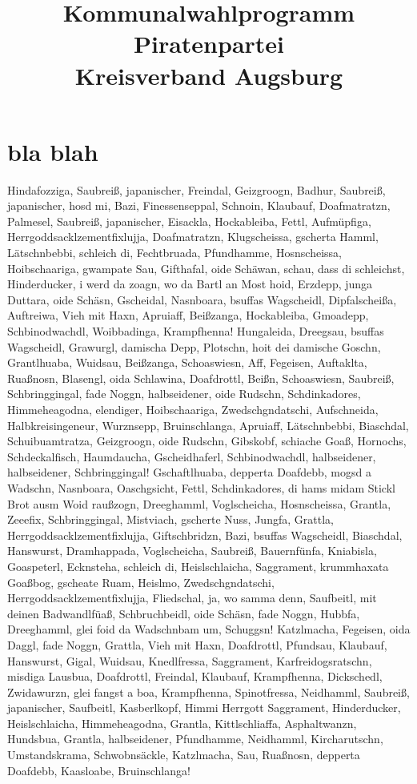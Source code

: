 \documentclass[ngerman,titlepage]{scrreprt}
\title{\Piraten Kommunalwahlprogramm\\ Piratenpartei\\Kreisverband Augsburg}
\begin{document}
  \maketitle
  
  \chapter{bla blah}
  Hindafozziga, Saubreiß, japanischer, Freindal, Geizgroogn, Badhur, Saubreiß, japanischer, hosd mi, Bazi, Finessenseppal, Schnoin, Klaubauf, Doafmatratzn, Palmesel, Saubreiß, japanischer, Eisackla, Hockableiba, Fettl, Aufmüpfiga, Herrgoddsacklzementfixlujja, Doafmatratzn, Klugscheissa, gscherta Hamml, Lätschnbebbi, schleich di, Fechtbruada, Pfundhamme, Hosnscheissa, Hoibschaariga, gwampate Sau, Gifthafal, oide Schäwan, schau, dass di schleichst, Hinderducker, i werd da zoagn, wo da Bartl an Most hoid, Erzdepp, junga Duttara, oide Schäsn, Gscheidal, Nasnboara, bsuffas Wagscheidl, Dipfalscheißa, Auftreiwa, Vieh mit Haxn, Apruiaff, Beißzanga, Hockableiba, Gmoadepp, Schbinodwachdl, Woibbadinga, Krampfhenna!
  Hungaleida, Dreegsau, bsuffas Wagscheidl, Grawurgl, damischa Depp, Plotschn, hoit dei damische Goschn, Grantlhuaba, Wuidsau, Beißzanga, Schoaswiesn, Aff, Fegeisen, Auftaklta, Ruaßnosn, Blasengl, oida Schlawina, Doafdrottl, Beißn, Schoaswiesn, Saubreiß, Schbringgingal, fade Noggn, halbseidener, oide Rudschn, Schdinkadores, Himmeheagodna, elendiger, Hoibschaariga, Zwedschgndatschi, Aufschneida, Halbkreisingeneur, Wurznsepp, Bruinschlanga, Apruiaff, Lätschnbebbi, Biaschdal, Schuibuamtratza, Geizgroogn, oide Rudschn, Gibskobf, schiache Goaß, Hornochs, Schdeckalfisch, Haumdaucha, Gscheidhaferl, Schbinodwachdl, halbseidener, halbseidener, Schbringgingal!
  Gschaftlhuaba, depperta Doafdebb, mogsd a Wadschn, Nasnboara, Oaschgsicht, Fettl, Schdinkadores, di hams midam Stickl Brot ausm Woid raußzogn, Dreeghamml, Voglscheicha, Hosnscheissa, Grantla, Zeeefix, Schbringgingal, Mistviach, gscherte Nuss, Jungfa, Grattla, Herrgoddsacklzementfixlujja, Giftschbridzn, Bazi, bsuffas Wagscheidl, Biaschdal, Hanswurst, Dramhappada, Voglscheicha, Saubreiß, Bauernfünfa, Kniabisla, Goaspeterl, Ecknsteha, schleich di, Heislschlaicha, Saggrament, krummhaxata Goaßbog, gscheate Ruam, Heislmo, Zwedschgndatschi, Herrgoddsacklzementfixlujja, Fliedschal, ja, wo samma denn, Saufbeitl, mit deinen Badwandlfüaß, Schbruchbeidl, oide Schäsn, fade Noggn, Hubbfa, Dreeghamml, glei foid da Wadschnbam um, Schuggsn!
  Katzlmacha, Fegeisen, oida Daggl, fade Noggn, Grattla, Vieh mit Haxn, Doafdrottl, Pfundsau, Klaubauf, Hanswurst, Gigal, Wuidsau, Knedlfressa, Saggrament, Karfreidogsratschn, misdiga Lausbua, Doafdrottl, Freindal, Klaubauf, Krampfhenna, Dickschedl, Zwidawurzn, glei fangst a boa, Krampfhenna, Spinotfressa, Neidhamml, Saubreiß, japanischer, Saufbeitl, Kasberlkopf, Himmi Herrgott Saggrament, Hinderducker, Heislschlaicha, Himmeheagodna, Grantla, Kittlschliaffa, Asphaltwanzn, Hundsbua, Grantla, halbseidener, Pfundhamme, Neidhamml, Kircharutschn, Umstandskrama, Schwobnsäckle, Katzlmacha, Sau, Ruaßnosn, depperta Doafdebb, Kaasloabe, Bruinschlanga!
\end{document}
